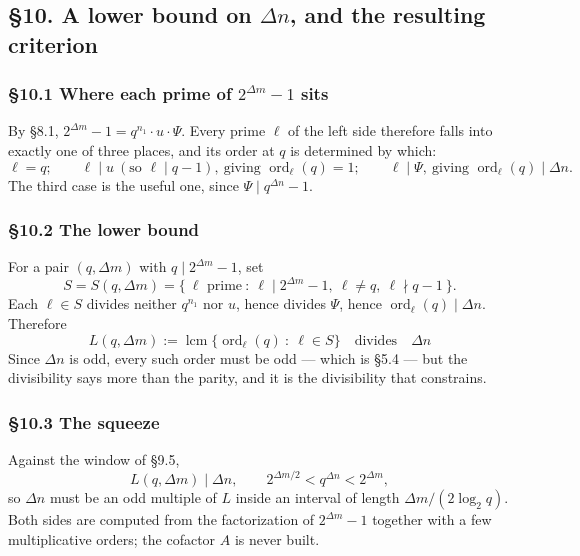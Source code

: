 \documentclass[11pt]{article}
\begin{document}
\subsection*{\S10. A lower bound on $\Delta n$, and the resulting criterion}

\subsubsection*{\S10.1 Where each prime of $2^{\Delta m}-1$ sits}

By \S8.1, $2^{\Delta m}-1 = q^{n_1}\cdot u \cdot \Psi$. Every prime $\ell$ of the left side therefore falls into exactly one of three places, and its order at $q$ is determined by which:
\[
\ell = q; \qquad \ell \mid u \ (\text{so } \ell \mid q-1), \ \text{giving } \operatorname{ord}_\ell(q) = 1; \qquad \ell \mid \Psi, \ \text{giving } \operatorname{ord}_\ell(q) \mid \Delta n .
\]
The third case is the useful one, since $\Psi \mid q^{\Delta n}-1$.

\subsubsection*{\S10.2 The lower bound}

For a pair $(q,\Delta m)$ with $q \mid 2^{\Delta m}-1$, set
\[
S = S(q,\Delta m) = \big\{\ \ell \text{ prime} \ :\ \ell \mid 2^{\Delta m}-1,\ \ell \neq q,\ \ell \nmid q-1\ \big\} .
\]
Each $\ell \in S$ divides neither $q^{n_1}$ nor $u$, hence divides $\Psi$, hence $\operatorname{ord}_\ell(q) \mid \Delta n$. Therefore
\[
\boxed{\ L(q,\Delta m) := \operatorname{lcm}\big\{\operatorname{ord}_\ell(q) \ :\ \ell \in S\big\} \quad\text{divides}\quad \Delta n\ }
\]
Since $\Delta n$ is odd, every such order must be odd --- which is \S5.4 --- but the divisibility says more than the parity, and it is the divisibility that constrains.

\subsubsection*{\S10.3 The squeeze}

Against the window of \S9.5,
\[
L(q,\Delta m) \mid \Delta n, \qquad 2^{\Delta m/2} < q^{\Delta n} < 2^{\Delta m} ,
\]
so $\Delta n$ must be an odd multiple of $L$ inside an interval of length $\Delta m/\!\left(2\log_2 q\right)$. Both sides are computed from the factorization of $2^{\Delta m}-1$ together with a few multiplicative orders; the cofactor $A$ is never built.
\end{document}
